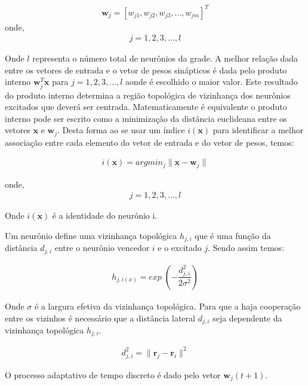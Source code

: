 \documentclass[journal, a4paper]{IEEEtran}
\begin{document}
\begin{eqnarray}
	\textbf{w}_{j}= [w_{j1}, w_{j2}, w_{j3}, ..., w_{jm}]^{T}
\end{eqnarray}
onde,
\begin{eqnarray}
	j=1,2,3,\hdots,l \nonumber
\end{eqnarray}

Onde $l$ representa o número total de neurônios da grade. A melhor relação dada entre os vetores de entrada e o vetor de pesos sinápticos é dada pelo produto interno $\textbf{w}_{j}^{T}\textbf{x}$ para $j=1,2,3,\hdots,l$ aonde é escolhido o maior valor. Este resultado do produto interno determina a região topológica de vizinhança dos neurônios excitados que deverá ser centrada. Matematicamente é equivalente o produto interno pode ser escrito como a minimização da  distância euclideana entre os vetores $\textbf{x}$ e $\textbf{w}_{j}$. Desta forma ao se usar um índice $i(\textbf{x})$ para identificar a melhor associação entre cada elemento do vetor de entrada e do vetor de pesos, temos:

\begin{eqnarray}
	i(\textbf{x})= argmin_{j}  \parallel \textbf{x} - \textbf{w}_{j} \parallel
\end{eqnarray}

onde,
\begin{eqnarray}
j=1,2,3,\hdots,l \nonumber
\end{eqnarray}

Onde $i(\textbf{x})$ é a identidade do neurônio i.

Um neurônio define uma vizinhança topológica $h_{j,i}$ que é uma função da distância $d_{j,i}$ entre o neurônio vencedor $i$ e o excitado $j$. Sendo assim temos:

\begin{eqnarray}
	h_{j,i(x)}=exp \; ( -\dfrac{d^{2}_{j,i}}{2\sigma^{2}} )
\end{eqnarray}

Onde $\sigma$ é a largura efetiva da vizinhança topológica. 
Para que a haja cooperação entre os vizinhos é necessário que a distância lateral $d_{j,i}$ seja dependente da vizinhança topológica $h_{j,i}$.

\begin{eqnarray}
d^{2}_{j,i}= \parallel \textbf{r}_{j}	- \textbf{r}_{i} \parallel^{2}
\end{eqnarray}


O processo adaptativo de tempo discreto é dado pelo vetor $\textbf{w}_{j}(t+1)$.
\end{document}
